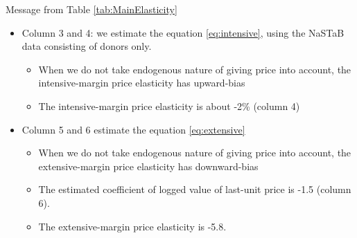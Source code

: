 \documentclass[
  ignorenonframetext,
  aspectratio=169,
]{beamer}
\providecommand{\tightlist}{%
  \setlength{\itemsep}{0pt}\setlength{\parskip}{0pt}}
\begin{document}
\begin{frame}{Message from Table \ref{tab:MainElasticity}}
\protect\hypertarget{message-from-table-reftabmainelasticity}{}
\begin{itemize}
\tightlist
\item
  Column 3 and 4: we estimate the equation \eqref{eq:intensive}, using the NaSTaB data consisting of donors only.

  \begin{itemize}
  \tightlist
  \item
    When we do not take endogenous nature of giving price into account, the intensive-margin price elasticity has upward-bias
  \item
    The intensive-margin price elasticity is about -2\% (column 4)
  \end{itemize}
\item
  Column 5 and 6 estimate the equation \eqref{eq:extensive}

  \begin{itemize}
  \tightlist
  \item
    When we do not take endogenous nature of giving price into account, the extensive-margin price elasticity has downward-bias
  \item
    The estimated coefficient of logged value of last-unit price is -1.5 (column 6).
  \item
    The extensive-margin price elasticity is -5.8.
  \end{itemize}
\end{itemize}
\end{frame}
\end{document}
